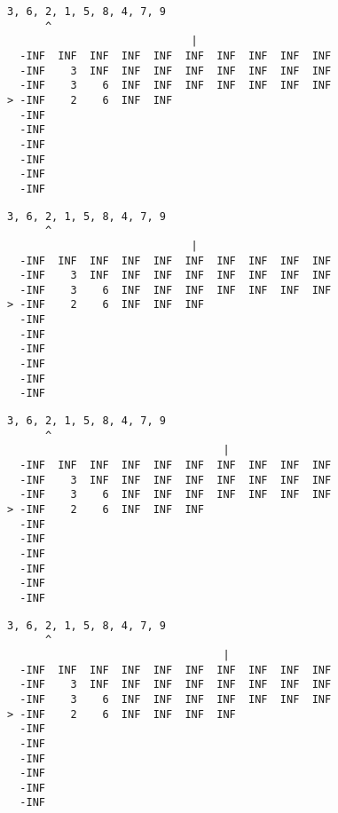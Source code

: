{ \begin{verbatim}
3, 6, 2, 1, 5, 8, 4, 7, 9
      ^
                             |
  -INF  INF  INF  INF  INF  INF  INF  INF  INF  INF
  -INF    3  INF  INF  INF  INF  INF  INF  INF  INF
  -INF    3    6  INF  INF  INF  INF  INF  INF  INF
> -INF    2    6  INF  INF                         
  -INF                                             
  -INF                                             
  -INF                                             
  -INF                                             
  -INF                                             
  -INF                                             
\end{verbatim} }

{ \begin{verbatim}
3, 6, 2, 1, 5, 8, 4, 7, 9
      ^
                             |
  -INF  INF  INF  INF  INF  INF  INF  INF  INF  INF
  -INF    3  INF  INF  INF  INF  INF  INF  INF  INF
  -INF    3    6  INF  INF  INF  INF  INF  INF  INF
> -INF    2    6  INF  INF  INF                    
  -INF                                             
  -INF                                             
  -INF                                             
  -INF                                             
  -INF                                             
  -INF                                             
\end{verbatim} }

{ \begin{verbatim}
3, 6, 2, 1, 5, 8, 4, 7, 9
      ^
                                  |
  -INF  INF  INF  INF  INF  INF  INF  INF  INF  INF
  -INF    3  INF  INF  INF  INF  INF  INF  INF  INF
  -INF    3    6  INF  INF  INF  INF  INF  INF  INF
> -INF    2    6  INF  INF  INF                    
  -INF                                             
  -INF                                             
  -INF                                             
  -INF                                             
  -INF                                             
  -INF                                             
\end{verbatim} }

{ \begin{verbatim}
3, 6, 2, 1, 5, 8, 4, 7, 9
      ^
                                  |
  -INF  INF  INF  INF  INF  INF  INF  INF  INF  INF
  -INF    3  INF  INF  INF  INF  INF  INF  INF  INF
  -INF    3    6  INF  INF  INF  INF  INF  INF  INF
> -INF    2    6  INF  INF  INF  INF               
  -INF                                             
  -INF                                             
  -INF                                             
  -INF                                             
  -INF                                             
  -INF                                             
\end{verbatim} }

